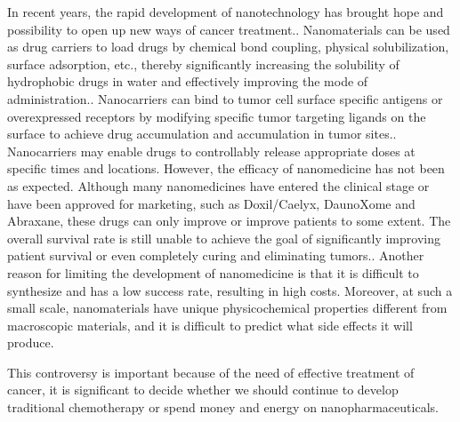 \documentclass[10pt]{article}
\begin{document}
\begin{flushleft}
In recent years, the rapid development of nanotechnology has brought hope and possibility to open up new ways of cancer treatment.\citep*{cho2008therapeutic,hubbell2012nanomaterials}. Nanomaterials can be used as drug carriers to load drugs by chemical bond coupling, physical solubilization, surface adsorption, etc., thereby significantly increasing the solubility of hydrophobic drugs in water and effectively improving the mode of administration.\citep*{guo2014nanoparticles}. Nanocarriers can bind to tumor cell surface specific antigens or overexpressed receptors by modifying specific tumor targeting ligands on the surface to achieve drug accumulation and accumulation in tumor sites.\citep*{bae2011targeted}. Nanocarriers may enable drugs to controllably release appropriate doses at specific times and locations\citep*{ganta2008review}. However, the efficacy of nanomedicine has not been as expected. Although many nanomedicines have entered the clinical stage or have been approved for marketing, such as Doxil/Caelyx, DaunoXome and Abraxane, these drugs can only improve or improve patients to some extent. The overall survival rate is still unable to achieve the goal of significantly improving patient survival or even completely curing and eliminating tumors.\citep*{chauhan2013strategies}. Another reason for limiting the development of nanomedicine is that it is difficult to synthesize and has a low success rate, resulting in high costs. Moreover, at such a small scale, nanomaterials have unique physicochemical properties different from macroscopic materials, and it is difficult to predict what side effects it will produce.
\par
This controversy is important because of the need of effective treatment of cancer, it is significant to decide whether we should continue to develop traditional chemotherapy or spend money and energy on nanopharmaceuticals.
\end{flushleft}
\newpage



\end{document}

